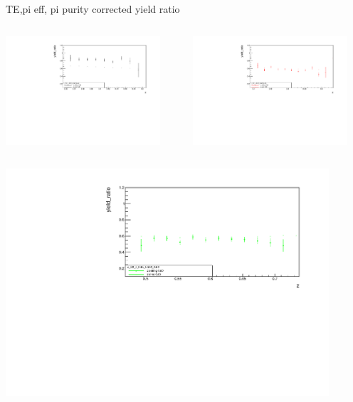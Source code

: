 \begin{frame}{TE,pi eff, pi purity corrected yield ratio}
\begin{columns}
\begin{column}[T]{0.5\textwidth}
\includegraphics[width = 0.9\textwidth]{results/yield/statistics_corr/x_Q2_z_65_5500_40_ratio.pdf}
\end{column}
\begin{column}[T]{0.5\textwidth}
\includegraphics[width = 0.9\textwidth]{results/yield/statistics_corr/x_Q2_z_65_5500_50_ratio.pdf}
\end{column}
\end{columns}
\begin{columns}
\begin{column}[T]{0.5\textwidth}
\includegraphics[width = 0.9\textwidth]{results/yield/statistics_corr/x_Q2_z_65_5500_60_ratio.pdf}

\end{column}
\end{columns}
\end{frame}
